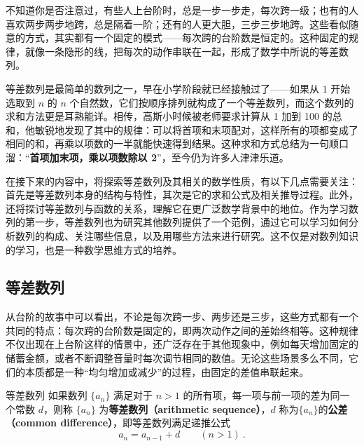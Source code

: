 
\begin{issues}
\issueDraft
\end{issues}


不知道你是否注意过，有些人上台阶时，总是一步一步走，每次跨一级；也有的人喜欢两步两步地跨，总是隔着一阶；还有的人更大胆，三步三步地跨。这些看似随意的方式，其实都有一个固定的模式——每次跨的台阶数是恒定的。这种固定的规律，就像一条隐形的线，把每次的动作串联在一起，形成了数学中所说的等差数列。

等差数列是最简单的数列之一，早在小学阶段就已经接触过了——如果从 $1$ 开始选取到  $n$  的  $n$  个自然数，它们按顺序排列就构成了一个等差数列，而这个数列的求和方法更是耳熟能详。相传，高斯小时候被老师要求计算从 1 加到 100 的总和，他敏锐地发现了其中的规律：可以将首项和末项配对，这样所有的项都变成了相同的和，再乘以项数的一半就能快速得到结果。这种求和方式总结为一句顺口溜：“\textbf{首项加末项，乘以项数除以 2}”，至今仍为许多人津津乐道。

在接下来的内容中，将探索等差数列及其相关的数学性质，有以下几点需要关注：首先是等差数列本身的结构与特性，其次是它的求和公式及相关推导过程。此外，还将探讨等差数列与函数的关系，理解它在更广泛数学背景中的地位。作为学习数列的第一步，等差数列也为研究其他数列提供了一个范例，通过它可以学习如何分析数列的构成、关注哪些信息，以及用哪些方法来进行研究。这不仅是对数列知识的学习，也是一种数学思维方式的培养。

\subsection{等差数列}

从台阶的故事中可以看出，不论是每次跨一步、两步还是三步，这些方式都有一个共同的特点：每次跨的台阶数是固定的，即两次动作之间的差始终相等。这种规律不仅出现在上台阶这样的情景中，还广泛存在于其他现象中，例如每天增加固定的储蓄金额，或者不断调整音量时每次调节相同的数值。无论这些场景多么不同，它们的本质都是一种“均匀增加或减少”的过程，由固定的差值串联起来。

\begin{definition}{等差数列}
如果数列 $\{a_n\}$ 满足对于 $n > 1$ 的所有项，每一项与前一项的差为同一个常数 $d$，则称 $\{a_n\}$ 为\textbf{等差数列（arithmetic sequence）}，$d$ 称为$\{a_n\}$的\textbf{公差（common difference）}，即等差数列满足递推公式
\begin{equation}
a_{n}=a_{n-1}+d\qquad(n>1)~.
\end{equation}
\end{definition}

